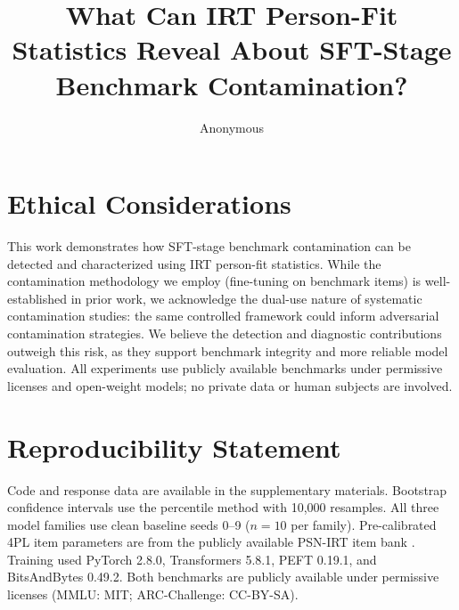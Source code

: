 \documentclass[11pt]{article}
\title{What Can IRT Person-Fit Statistics Reveal About SFT-Stage Benchmark Contamination?}
\author{Anonymous}
\begin{document}
\maketitle

\begin{abstract}

\end{abstract}










\section*{Ethical Considerations}
This work demonstrates how SFT-stage benchmark contamination can be detected and characterized using IRT person-fit statistics.
While the contamination methodology we employ (fine-tuning on benchmark items) is well-established in prior work, we acknowledge the dual-use nature of systematic contamination studies: the same controlled framework could inform adversarial contamination strategies.
We believe the detection and diagnostic contributions outweigh this risk, as they support benchmark integrity and more reliable model evaluation.
All experiments use publicly available benchmarks under permissive licenses and open-weight models; no private data or human subjects are involved.

\section*{Reproducibility Statement}
Code and response data are available in the supplementary materials.
Bootstrap confidence intervals use the percentile method with 10,000 resamples.
All three model families use clean baseline seeds 0--9 ($n{=}10$ per family).
Pre-calibrated 4PL item parameters are from the publicly available PSN-IRT item bank \citep{psnirt2026}.
Training used PyTorch 2.8.0, Transformers 5.8.1, PEFT 0.19.1, and BitsAndBytes 0.49.2.
Both benchmarks are publicly available under permissive licenses (MMLU: MIT; ARC-Challenge: CC-BY-SA).



\appendix

\end{document}
